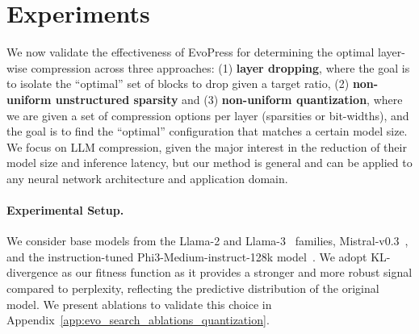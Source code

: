 \documentclass{article}
\theoremstyle{plain}
\theoremstyle{definition}
\theoremstyle{remark}
\newcommand{\methodname}{EvoPress}
\begin{document}
\section{Experiments}\label{sect:experiments}

We now validate the effectiveness of \methodname{} for determining the optimal layer-wise compression across three approaches: (1) \textbf{layer dropping}, where the goal is to isolate the ``optimal'' set of blocks to drop given a target ratio, (2) \textbf{non-uniform unstructured sparsity} and (3) \textbf{non-uniform quantization}, where we are given a set of compression options per layer (sparsities or bit-widths), and the goal is to find the ``optimal'' configuration that matches a certain model size. 
We focus on LLM compression, given the major interest in the reduction of their model size and inference latency, but our method is general and can be applied to any neural network architecture and application domain. 

\paragraph{Experimental Setup.}
We consider base models from the Llama-2 and Llama-3~\citep{touvron2023llama} families, Mistral-v0.3~\citep{jiang2023mistral}, and the instruction-tuned Phi3-Medium-instruct-128k model~\citep{abdin2024phi3}. We adopt KL-divergence as our fitness function as it provides a stronger and more robust signal compared to perplexity, reflecting the predictive distribution of the original model. We present ablations to validate this choice in Appendix~\ref{app:evo_search_ablations_quantization}. 
\end{document}
